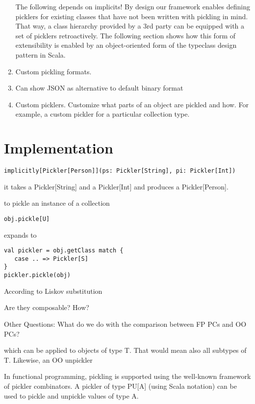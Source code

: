 \documentclass[preprint,10pt]{sigplanconf}
\begin{document}
\begin{enumerate}
\item [The following depends on implicits!] By design our framework enables defining picklers for existing classes that have not been written with pickling in mind. That way, a class hierarchy provided by a 3rd party can be equipped with a set of picklers retroactively. The following section shows how this form of extensibility is enabled by an object-oriented form of the typeclass design pattern in Scala.
\item Custom pickling formats.
\item Can show JSON as alternative to default binary format
\item Custom picklers. Customize what parts of an object are pickled and how. For example, a custom pickler for a particular collection type.
\end{enumerate}

\section{Implementation}

\begin{verbatim}
implicitly[Pickler[Person]](ps: Pickler[String], pi: Pickler[Int])
\end{verbatim}

it takes a Pickler[String] and a Pickler[Int] and produces a Pickler[Person].

to pickle an instance of a collection

\begin{verbatim}
obj.pickle[U]
\end{verbatim}

expands to

\begin{verbatim}
val pickler = obj.getClass match {
   case .. => Pickler[S]
}
pickler.pickle(obj)
\end{verbatim}

According to Liskov substitution

Are they composable? How?

Other Questions:
What do we do with the comparison between FP PCs and OO PCs?


which can be applied to objects of type T. That would mean also all subtypes of T. Likewise, an OO unpickler


In functional programming, pickling is supported using the well-known framework of pickler combinators. A pickler of type PU[A] (using Scala notation) can be used to pickle and unpickle values of type A.
\end{document}
